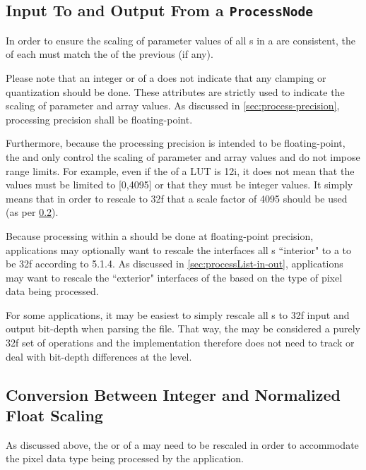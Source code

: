 \subsection{Input To and Output From a \texttt{ProcessNode}}
In order to ensure the scaling of parameter values of all s in a  are consistent, the  of each  must match the  of the previous  (if any). 

Please note that an integer  or  of a  does not indicate that any clamping or quantization should be done. These attributes are strictly used to indicate the scaling of parameter and array values. As discussed in \ref{sec:process-precision}, processing precision shall be floating-point.

Furthermore, because the processing precision is intended to be floating-point, the  and  only control the scaling of parameter and array values and do not impose range limits. For example, even if the  of a LUT  is 12i, it does not mean that the  values must be limited to [0,4095] or that they must be integer values. It simply means that in order to rescale to 32f that a scale factor of 4095 should be used (as per \ref{sec:scaling}).

Because processing within a  should be done at floating-point precision, applications may optionally want to rescale the interfaces all s ``interior" to a  to be 32f according to 5.1.4. As discussed in \ref{sec:processList-in-out}, applications may want to rescale the ``exterior" interfaces of the  based on the type of pixel data being processed.

For some applications, it may be easiest to simply rescale all s to 32f input and output bit-depth when parsing the file. That way, the  may be considered a purely 32f set of operations and the implementation therefore does not need to track or deal with bit-depth differences at the  level.


\subsection{Conversion Between Integer and Normalized Float Scaling} \label{sec:scaling}
As discussed above, the  or  of a  may need to be rescaled in order to accommodate the pixel data type being processed by the application. 

